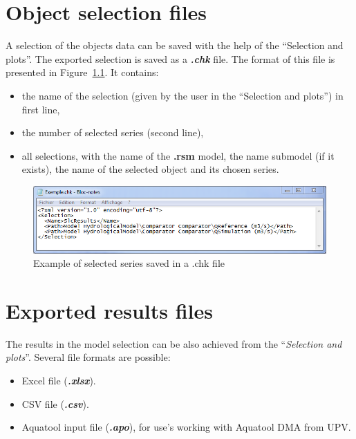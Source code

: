 \documentclass[
  letterpaper,
  DIV=11,
  numbers=noendperiod]{scrreprt}
\begin{document}
\hypertarget{object-selection-files}{%
\chapter{Object selection files}\label{object-selection-files}}

A selection of the objects data can be saved with the help of the
``Selection and plots''. The exported selection is saved as a
\textbf{\emph{.chk}} file. The format of this file is presented in
Figure~\ref{fig-example_select_series_chk_file}. It contains:

\begin{itemize}
\item
  the name of the selection (given by the user in the ``Selection and
  plots'') in first line,
\item
  the number of selected series (second line),
\item
  all selections, with the name of the \textbf{.rsm} model, the name
  submodel (if it exists), the name of the selected object and its
  chosen series.
\end{itemize}

\begin{figure}

{\centering \includegraphics{./figures/fig-example_select_series_chk_file.png}

}

\caption{\label{fig-example_select_series_chk_file}Example of selected
series saved in a .chk file}

\end{figure}

\hypertarget{exported-results-files}{%
\chapter{Exported results files}\label{exported-results-files}}

The results in the model selection can be also achieved from the
``\emph{Selection and plots}''. Several file formats are possible:

\begin{itemize}
\item
  Excel file (\textbf{\emph{.xlsx}}).
\item
  CSV file (\textbf{\emph{.csv}}).
\item
  Aquatool input file (\textbf{\emph{.apo}}), for use's working with
  Aquatool DMA from UPV.
\end{itemize}
\end{document}
